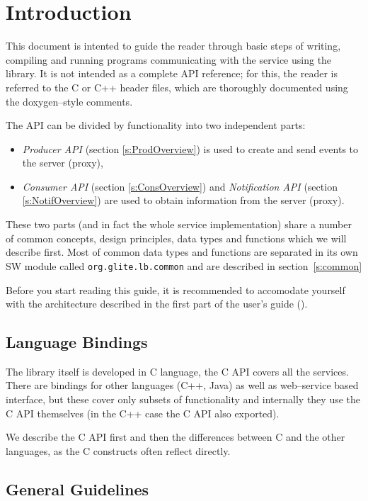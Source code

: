 
\section{Introduction}

This document is intented to guide the reader through basic steps
of writing, compiling and running programs communicating with the \LB
service using the \LB library. It is not intended as a complete API
reference; for this, the reader is referred to the C or C++ header
files, which are thoroughly documented using the doxygen--style
comments. 

The \LB API can be divided by functionality into two independent
parts:
\begin{itemize}
\item \textit{\LB Producer API} (section \ref{s:ProdOverview}) is used
to create and send events to the \LB server (proxy),
\item \textit{\LB Consumer API} (section \ref{s:ConsOverview}) and \textit{\LB
Notification API} (section \ref{s:NotifOverview}) are used to obtain
information from the  \LB server (proxy).
\end{itemize}
These two parts (and in fact the whole \LB service implementation)
share a number of common concepts, design principles, data types and
functions which we will describe first. Most of common data types and
functions are separated in its own SW module called
\verb'org.glite.lb.common' and are described in section~\ref{s:common}

%
Before you start reading this guide, it is recommended to accomodate
yourself with the \LB architecture described in the first part of the
\LB user's guide (\cite{lbug}).


\subsection{Language Bindings}
The \LB library itself is developed in C language, the C API covers
all the \LB services. There are bindings for other languages (C++,
Java) as well as web--service based interface, but these cover only
subsets of \LB functionality and internally they use the C API
themselves (in the C++ case the C API also exported).

We describe the C API first and then the differences between C and the
other languages, as the C constructs often reflect directly.

\subsection{General Guidelines}

